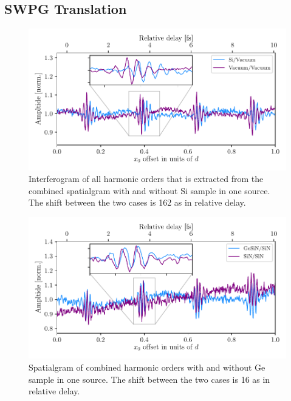 \subsection{SWPG Translation}

\begin{figure}
	\centering
	\includegraphics[width=1.0\textwidth]{figures/refractive_index/cross_correlation_si.pdf}
	\caption[Interferogram of all harmonic orders with and without Si sample in one source]{Interferogram of all harmonic orders that is extracted from the combined spatialgram with and without Si sample in one source.  The shift between the two cases is 162 as in relative delay.}
	\label{fig:interferogram_si}
\end{figure}

\begin{figure}
	\centering
	\includegraphics[width=1.0\textwidth]{figures/refractive_index/cross_correlation_ge.pdf}
	\caption[Spatialgram of combined harmonic orders with and without Ge sample in one source]{Spatialgram of combined harmonic orders with and without Ge sample in one source. The shift between the two cases is 16 as in relative delay.}
	\label{fig:interferogram_ge}
\end{figure}



